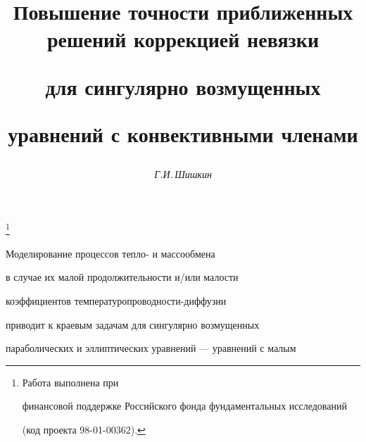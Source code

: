 

 


\setcounter{page}{81}















\author{\it Г.И.\,Шишкин}




\title{Повышение точности приближенных решений коррекцией невязки


для сингулярно возмущенных


уравнений с конвективными членами}


\thanks{Работа выполнена при


финансовой поддержке Российского фонда фундаментальных исследований


(код проекта 98-01-00362).}





\date{}




\pagestyle{plain} %







\maketitle


\label{begin}





Моделирование процессов тепло- и массообмена


в случае их малой продолжительности и/или малости


коэффициентов температуропроводности-диффузии


приводит к краевым задачам для сингулярно возмущенных


параболических и эллиптических уравнений --- уравнений с малым


